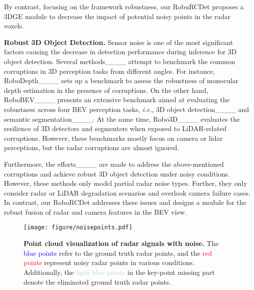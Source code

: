 By contrast, focusing on the framework robustness, our RobuRCDet proposes a 3DGE module to decrease the impact of potential noisy points in the radar voxels. 

{\flushleft \textbf{Robust 3D Object Detection.}} Sensor noise is one of the most significant factors causing the decrease in detection performance during inference for 3D object detection. 
%
Several methods____ attempt to benchmark the common corruptions in 3D perception tasks from different angles. 
For instance, RoboDepth____ sets up a benchmark to assess the robustness of monocular depth estimation in the presence of corruptions. On the other hand, RoboBEV____ presents an extensive benchmark aimed at evaluating the robustness across four BEV perception tasks, \textit{i.e.}, 3D object detection____ and semantic segmentation____.
%
At the same time, Robo3D____ evaluates the resilience of 3D detectors and segmenters when exposed to LiDAR-related corruptions. However, these benchmarks mostly focus on camera or lidar perceptions, but the radar corruptions are almost ignored.

Furthermore, the efforts____ are made to address the above-mentioned corruptions and achieve robust 3D object detection under noisy conditions.
%
However, these methods only model partial radar noise types. Further, they only consider radar or LiDAR degradation scenarios and overlook camera failure cases. 
%
In contrast, our RoboRCDet addresses these issues and designs a module for the robust fusion of radar and camera features in the BEV view.




\begin{figure}
    \centering
    \texttt{[image: figure/noisepoints.pdf]}
    \caption{\textbf{Point cloud visualization of radar signals with noise.} The \textcolor{blue}{blue points} refer to the ground truth radar points, and the \textcolor{red}{red points} represent noisy radar points in various conditions. Additionally, the \textcolor{lightblue}{light blue points} in the key-point missing part denote the eliminated ground truth radar points.
}
\label{noisypoint}
\end{figure}